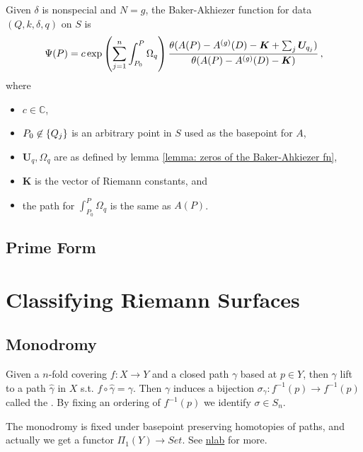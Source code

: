 \documentclass{article}
\begin{document}
\begin{theorem}
	Given $\delta$ is nonspecial and $N=g$, the Baker-Akhiezer function for data $(Q,k,\delta,q)$ on $S$ is 
	\[
	\Psi(P) = c \exp \left( \sum_{j=1}^n \int_{P_0}^P \Omega_q \right) \frac{\theta(A(P) - A^{(g)}(D)  - \bm{K} + \sum_{j} \bm{U}_{q_j})}{\theta(A(P) - A^{(g)}(D) - \bm{K})} \, ,
	\]
	where 
	\begin{itemize}
		\item $c \in \mathbb{C}$,
		\item $P_0\not\in \left\{ Q_j \right\}$ is an arbitrary point in $S$ used as the basepoint for $A$,
		\item $\bm{U}_q, \Omega_q$ are as defined by lemma \ref{lemma: zeros of the Baker-Ahkiezer fn},
		\item $\bm{K}$ is the vector of Riemann constants, and 
		\item the path for $\int_{P_0}^P \Omega_q$ is the same as $A(P)$. 
	\end{itemize}
\end{theorem}

\subsection{Prime Form}





\section{Classifying Riemann Surfaces}

\subsection{Monodromy}
\begin{definition}
	Given a $n$-fold covering $f:X \to Y$ and a closed path $\gamma$ based at $p \in Y$, then $\gamma$ lift to a path $\hat{\gamma}$ in $X$ s.t. $f \circ \hat{\gamma}=\gamma$. Then $\gamma$ induces a bijection $\sigma_\gamma : f^{-1}(p) \to f^{-1}(p)$ called the . By fixing an ordering of $f^{-1}(p)$ we identify $\sigma \in S_n$.  
\end{definition}
\begin{remark}
	The monodromy is fixed under basepoint preserving homotopies of paths, and actually we get a functor $\Pi_1(Y) \to Set$. See \href{https://ncatlab.org/nlab/show/monodromy}{nlab} for more. 
\end{remark}
\end{document}
